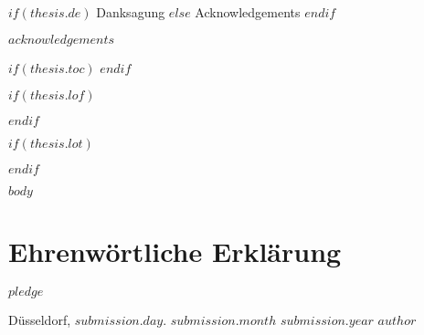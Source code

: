 \cleardoublepage
\begin{center}
    \huge
    $if(thesis.de)$
    Danksagung
    $else$
    Acknowledgements
    $endif$
\end{center}
$acknowledgements$

\cleardoublepage

$if(thesis.toc)$
\tableofcontents
$endif$

$if(thesis.lof)$
\listoffigures
$endif$

$if(thesis.lot)$
\listoftables
$endif$

\mainmatter

$body$

\backmatter

\printbibliography

\cleardoublepage

\printindex

\chapter*{Ehrenwörtliche Erklärung}

$pledge$

\vspace{3cm}

\noindent Düsseldorf, $submission.day$. $submission.month$ $submission.year$ \hfill $author$


\cleardoublepage
